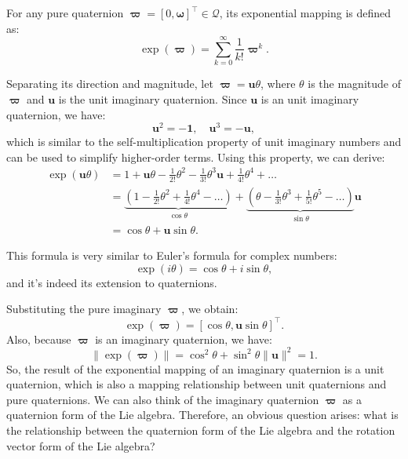 For any pure quaternion $\boldsymbol{\varpi} = [0, \boldsymbol{\omega}]^\top \in 
\mathcal{Q}$, its exponential mapping is defined as:
\begin{equation}\label{key}
	\exp \left( \boldsymbol{\varpi}  \right) = \sum\limits_{k = 0}^\infty  {\frac{1}{{k!}}{\boldsymbol{\varpi}^k}} .
\end{equation}

Separating its direction and magnitude, let $\boldsymbol{\varpi} =  \mathbf{u} \theta$, where $\theta$ is the magnitude of $\boldsymbol{\varpi}$ and $\mathbf{u}$ is the unit imaginary quaternion. Since $\mathbf{u}$ is an unit imaginary quaternion, we have:
\begin{equation}\label{key}
	\mathbf{u}^2 = -\mathbf{1}, \quad \mathbf{u}^3 = -\mathbf{u},
\end{equation}
which is similar to the self-multiplication property of unit imaginary numbers and can be used to simplify higher-order terms. Using this property, we can derive:
\begin{equation}\label{key}
	\begin{aligned}
		\exp \left( {\mathbf{u}\theta } \right) &= 1 + \mathbf{u}\theta  - \frac{1}{{2!}}{\theta ^2} - \frac{1}{{3!}}{\theta 
			^3}\mathbf{u} + \frac{1}{{4!}}{\theta ^4} +  \ldots \\
		&= \underbrace{\left( {1 - \frac{1}{{2!}}{\theta ^2} + \frac{1}{{4!}}{\theta ^4} -  \ldots } \right)}_{\cos 
			\theta} + \underbrace{\left( {\theta  - \frac{1}{{3!}}{\theta ^3} + \frac{1}{{5!}}{\theta ^5} -  \ldots } 
			\right)}_{\sin \theta}\mathbf{u} \\
		&= \cos \theta  + \mathbf{u}\sin \theta .
	\end{aligned}
\end{equation}

This formula is very similar to Euler's formula for complex numbers:
\begin{equation}\label{key}
	\exp(i \theta) = \cos \theta + i \sin \theta,
\end{equation}
and it's indeed its extension to quaternions.

Substituting the pure imaginary $\boldsymbol{\varpi}$, we obtain:
\begin{equation}\label{eq:2.66}
	\exp(\boldsymbol{\varpi}) = [\cos\theta, \mathbf{u} \sin \theta] ^\top.
\end{equation}
Also, because $\boldsymbol{\varpi}$ is an imaginary quaternion, we have:
\begin{equation}\label{key}
	\| \exp(\boldsymbol{\varpi}) \| = \cos^2 \theta + \sin^2 \theta \| \mathbf{u} \|^2 = 1.
\end{equation}
So, the result of the exponential mapping of an imaginary quaternion is a unit quaternion, which is also a mapping relationship between unit quaternions and pure quaternions. We can also think of the imaginary quaternion $\boldsymbol{\varpi}$ as a quaternion form of the Lie algebra. Therefore, an obvious question arises: what is the relationship between the quaternion form of the Lie algebra and the rotation vector form of the Lie algebra?

